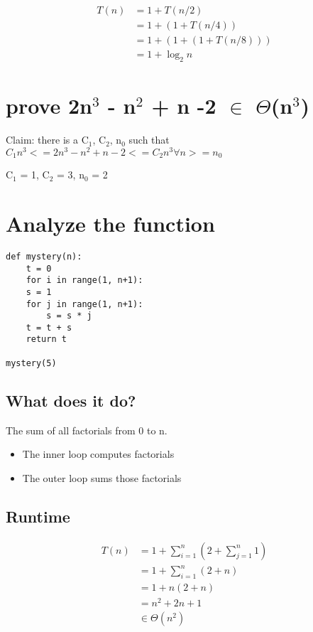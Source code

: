 \documentclass[12pt]{article}
\begin{document}
\begin{align}
  T(n) &= 1 + T(n/2) \\
  &= 1 + (1 + T(n/4)) \\
  &= 1 + (1 + (1 + T(n/8))) \\
  &= 1 + \log_2 n
\end{align}

\section{prove 2n$^{\text{3}}$ - n$^{\text{2}}$ + n -2 $\in$ $\Theta$(n$^{\text{3}}$)}
\label{sec-4}

Claim: there is a C$_{\text{1}}$, C$_{\text{2}}$, n$_{\text{0}}$ such that $C_1 n^3 <= 2n^3 - n^2 + n
-2<= C_2 n^3 \forall n >= n_0$

C$_{\text{1}}$ = 1, C$_{\text{2}}$ = 3, n$_{\text{0}}$ = 2

\section{Analyze the function}
\label{sec-5}

\lstset{language=Python,label= ,caption= ,numbers=none}
\begin{lstlisting}
def mystery(n):
    t = 0
    for i in range(1, n+1):
	s = 1
	for j in range(1, n+1):
	    s = s * j
	t = t + s
    return t

mystery(5)
\end{lstlisting}

\subsection{What does it do?}
\label{sec-5-1}

The sum of all factorials from 0 to n.

\begin{itemize}
\item The inner loop computes factorials
\item The outer loop sums those factorials
\end{itemize}

\subsection{Runtime}
\label{sec-5-2}

\begin{align}
  T(n) &= 1 + \sum_{i=1}^{n}(2 + \sum_{j=1}^{n} 1) \\
  &= 1 + \sum_{i=1}^{n} (2+n) \\
  &= 1 + n(2+n) \\
  &= n^2 + 2n + 1 \\
  &\in \Theta(n^2)
\end{align}
\end{document}
